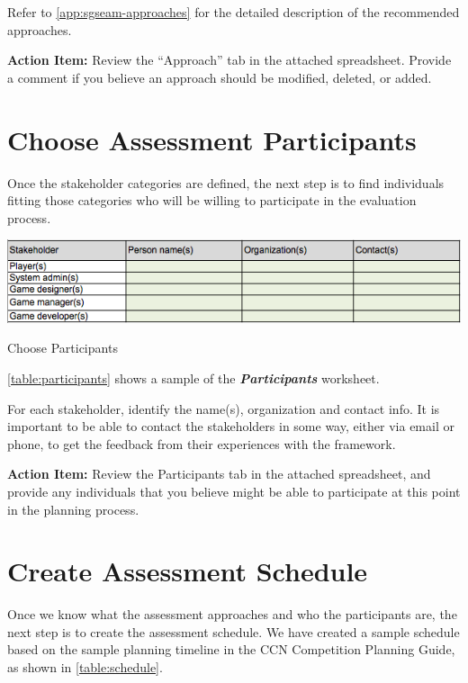 \documentclass[11pt,oneside]{book}
\begin{document}
Refer to \autoref{app:sgseam-approaches}  for the detailed
description of the recommended approaches.

\begin{shadebox}
{\bf Action Item:} Review the ``Approach'' tab in the attached
spreadsheet.  Provide a comment if you believe an approach should be
modified, deleted, or added.
\end{shadebox}


\section{Choose Assessment Participants}

Once the stakeholder categories are defined, the next step is to find
individuals fitting those categories who will be willing to
participate in the evaluation process. 

\begin{table}[ht!]
  \center
  \includegraphics[width=0.9\columnwidth]{participant}
  \caption{Choose Participants}
  \label{table:participants}
\end{table}

\autoref{table:participants} shows a sample of the \textbf{\textit{Participants}} worksheet. 

For each stakeholder, identify the name(s), organization and contact
info. It is important to be able to contact the stakeholders in some
way, either via email or phone, to get the feedback from their
experiences with the framework.

\begin{shadebox}
{\bf Action Item:} Review the Participants tab in the attached
spreadsheet, and provide any individuals that you believe might be
able to participate at this point in the planning process.
\end{shadebox}

\section{Create Assessment Schedule}

Once we know what the assessment approaches and who the participants are, the next step is to create the assessment 
schedule. We have created a sample schedule based on the sample
planning timeline in the CCN Competition Planning Guide, as shown in
\autoref{table:schedule}. 
\end{document}
